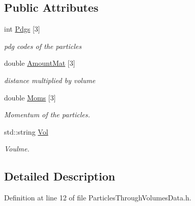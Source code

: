 \subsection*{Public Attributes}
\begin{DoxyCompactItemize}
\item 
int \hyperlink{class_neutrino_flux_reweight_1_1_particles_through_volumes_data_aa4f638f9eebba5ba2d59f909c077fa19}{Pdgs} \mbox{[}3\mbox{]}
\begin{DoxyCompactList}\small\item\em pdg codes of the particles \end{DoxyCompactList}\item 
double \hyperlink{class_neutrino_flux_reweight_1_1_particles_through_volumes_data_a897eba4f8766a1c110c4e473150f6c6e}{Amount\-Mat} \mbox{[}3\mbox{]}
\begin{DoxyCompactList}\small\item\em distance multiplied by volume \end{DoxyCompactList}\item 
double \hyperlink{class_neutrino_flux_reweight_1_1_particles_through_volumes_data_a373e722f967c878fa1749ae224a721fc}{Moms} \mbox{[}3\mbox{]}
\begin{DoxyCompactList}\small\item\em Momentum of the particles. \end{DoxyCompactList}\item 
std\-::string \hyperlink{class_neutrino_flux_reweight_1_1_particles_through_volumes_data_a7981341eb993e13d4512cf438c1c2e52}{Vol}
\begin{DoxyCompactList}\small\item\em Voulme. \end{DoxyCompactList}\end{DoxyCompactItemize}


\subsection{Detailed Description}


Definition at line 12 of file Particles\-Through\-Volumes\-Data.\-h.




